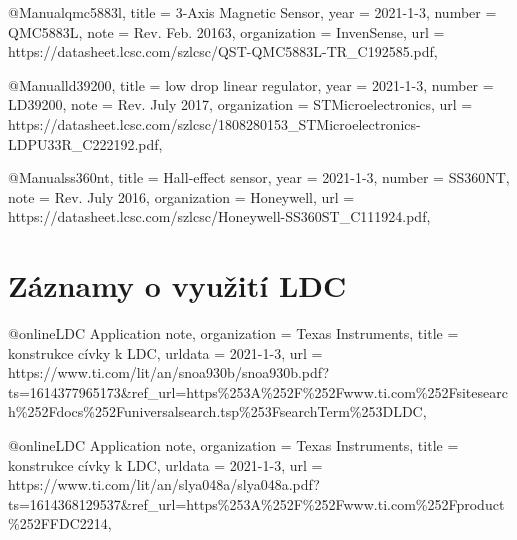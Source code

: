 @Manual{qmc5883l,
    title        = {3-Axis Magnetic Sensor},
    year         = {2021-1-3},
    number       = {QMC5883L},
    note         = {Rev. Feb. 20163},
    organization = {InvenSense},
    url          = {https://datasheet.lcsc.com/szlcsc/QST-QMC5883L-TR_C192585.pdf},
}

@Manual{ld39200,
    title        = {low drop linear regulator},
    year         = {2021-1-3},
    number       = {LD39200},
    note         = {Rev. July 2017},
    organization = {STMicroelectronics},
    url          = {https://datasheet.lcsc.com/szlcsc/1808280153_STMicroelectronics-\-LD\-PU33R_C222192.pdf},
}

@Manual{ss360nt,
    title        = {Hall-effect sensor},
    year         = {2021-1-3},
    number       = {SS360NT},
    note         = {Rev. July 2016},
    organization = {Honeywell},
    url          = {https://da\-ta\-sheet\-.lcsc.com/szlcsc/Honeywell-SS360ST_C111924.pdf},
}

\section{Záznamy o využití LDC}
@online{LDC Application note,
    organization = {Texas Instruments},
    title        = {konstrukce cívky k LDC},
    urldata      = {2021-1-3},
    url          = {https://www.ti.com/lit/an\-/\-snoa\-930b/snoa930b.pdf?ts=1614377965173&ref_url=https\%253A\%252F\-\%252F\-www.\-ti.com\-\%252F\-sitesearch\%252Fdocs\%252Funiversalsearch.tsp\%253F\-searchTerm\%253DLDC},
}

@online{LDC Application note,
    organization = {Texas Instruments},
    title        = {konstrukce cívky k LDC},
    urldata      = {2021-1-3},
    url          = {https://www.ti.com/\-lit/\-an/\-slya048a/slya048a.pdf?ts=1614368129537&ref_url=https\%253A\-\%252F\-\%252F\-www.ti.com\%252Fproduct\%252FFDC2214},
}

